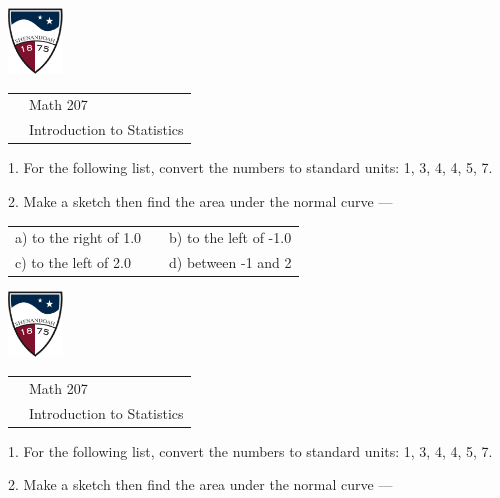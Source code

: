 \documentclass[10pt]{article}
\begin{document}
\pagestyle{empty}

\href{http://www.su.edu}{\includegraphics[height=1.75cm]{sulogo.eps}}
\vspace{-1.69cm}

{\small\hfill
\begin{tabular}{cl}
 & Math 207\\ &  Introduction to Statistics\\
\end{tabular}
}

\setlength{\baselineskip}{1.05\baselineskip}
\bigskip\bigskip

1. For the following list, convert the numbers to standard units:
1, 3, 4, 4, 5, 7.
\vspace{1.25in}

2. Make a sketch then find the area under the normal curve ---

\begin{center}
\begin{tabular}{lcl}
a) to the right of 1.0  &\hspace{2in} & b) to the left of -1.0\\[1in]
c) to the left of 2.0   &             & d) between -1 and 2
\end{tabular}
\end{center}
\vspace{.75in}

\href{http://www.su.edu}{\includegraphics[height=1.75cm]{sulogo.eps}}
\vspace{-1.69cm}


{\small\hfill
\begin{tabular}{cl}
 & Math 207\\ &  Introduction to Statistics\\
\end{tabular}
}
\bigskip\bigskip

1. For the following list, convert the numbers to standard units:
1, 3, 4, 4, 5, 7.
\vspace{1.25in}

2. Make a sketch then find the area under the normal curve ---
\end{document}
